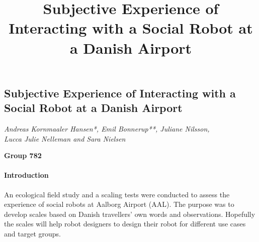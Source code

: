 \documentclass[a4paper]{article}
\title{Subjective Experience of Interacting with a Social Robot at a Danish Airport}
\begin{document}
{\centering 
\subsection*{Subjective Experience of Interacting with a Social Robot at a Danish Airport}}

{\centering
\textit{Andreas Kornmaaler Hansen*, Emil Bonnerup**, Juliane Nilsson, \\
Lucca Julie Nelleman and Sara Nielsen}
\par}

{\centering
\textbf{Group 782}
\par}


\bigskip

\paragraph{Introduction}
An ecological field study and a scaling tests were conducted to assess the experience of social robots at Aalborg Airport (AAL). The purpose was to develop scales based on Danish travellers' own words and observations. Hopefully the scales will help robot designers to design their robot for different use cases and target groups. 
\end{document}
